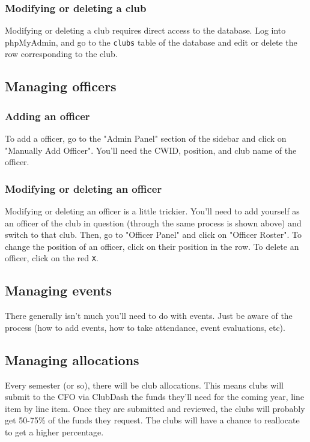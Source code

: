 \documentclass[11pt]{report}
\begin{document}
			\subsubsection{Modifying or deleting a club}
				Modifying or deleting a club requires direct access to the database. Log into phpMyAdmin, and go to the \texttt{clubs} table of the database and edit or delete the row corresponding to the club.
		
		\subsection{Managing officers}
			\subsubsection{Adding an officer}
				To add a officer, go to the "Admin Panel" section of the sidebar and click on "Manually Add Officer". You'll need the CWID, position, and club name of the officer.
	
			\subsubsection{Modifying or deleting an officer}		
				Modifying or deleting an officer is a little trickier. You'll need to add yourself as an officer of the club in question (through the same process is shown above) and switch to that club. Then, go to "Officer Panel" and click on "Officer Roster". To change the position of an officer, click on their position in the row. To delete an officer, click on the red \texttt{X}.
		
		\subsection{Managing events}
			There generally isn't much you'll need to do with events. Just be aware of the process (how to add events, how to take attendance, event evaluations, etc).
		
		\subsection{Managing allocations}
			Every semester (or so), there will be club allocations. This means clubs will submit to the CFO via ClubDash the funds they'll need for the coming year, line item by line item. Once they are submitted and reviewed, the clubs will probably get 50-75\% of the funds they request. The clubs will have a chance to reallocate to get a higher percentage.
	
\end{document}
